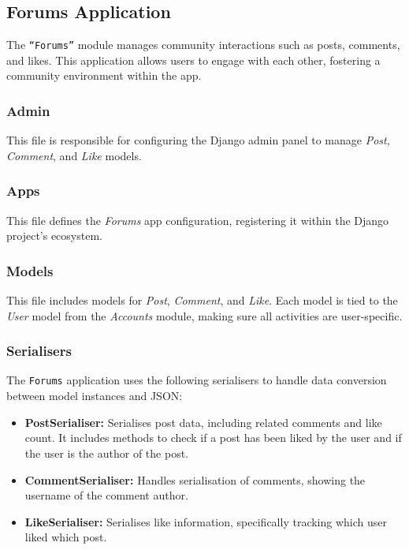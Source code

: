 \subsection{Forums Application}

The \texttt{``Forums''} module manages community interactions such as posts, comments, and likes. This application allows users to engage with each other, fostering a community environment within the app.

\subsubsection{Admin}

This file is responsible for configuring the Django admin panel to manage \textit{Post}, \textit{Comment}, and \textit{Like} models.

\subsubsection{Apps}

This file defines the \textit{Forums} app configuration, registering it within the Django project's ecosystem.

\subsubsection{Models} 

This file includes models for \textit{Post}, \textit{Comment}, and \textit{Like}. Each model is tied to the \textit{User} model from the \textit{Accounts} module, making sure all activities are user-specific.

\subsubsection{Serialisers}

The \texttt{Forums} application uses the following serialisers to handle data conversion between model instances and JSON:
\begin{itemize}
    \item \textbf{PostSerialiser:} Serialises post data, including related comments and like count. It includes methods to check if a post has been liked by the user and if the user is the author of the post.
    \item \textbf{CommentSerialiser:} Handles serialisation of comments, showing the username of the comment author.
    \item \textbf{LikeSerialiser:} Serialises like information, specifically tracking which user liked which post.
\end{itemize}

